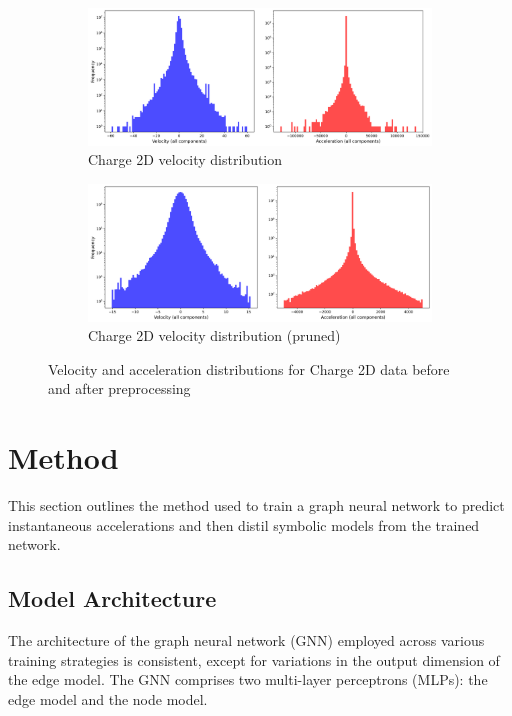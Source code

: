 \documentclass[11pt]{article}
\begin{document}
\begin{figure}[H]
    \centering
    \begin{subfigure}{0.9\textwidth}
        \includegraphics[width=\textwidth]{figs/charge_2_accel_vel_dist_unpruned.png}
        \caption{Charge 2D velocity distribution}
        \label{fig:charge_2_vel_dist_unpruned}
    \end{subfigure}
    \begin{subfigure}{0.9\textwidth}
        \includegraphics[width=\textwidth]{figs/charge_2_accel_vel_dist_pruned.png}
        \caption{Charge 2D velocity distribution (pruned)}
        \label{fig:charge_2_vel_dist_pruned}
    \end{subfigure}
    \caption{Velocity and acceleration distributions for Charge 2D data before and after preprocessing}
    \label{fig:distributions}
\end{figure}


\section{Method}
This section outlines the method used to train a graph neural network to predict instantaneous accelerations and then distil symbolic models from the trained network.

\subsection{Model Architecture}
The architecture of the graph neural network (GNN) employed across various training strategies is consistent, except for variations in the output dimension of the edge model. The GNN comprises two multi-layer perceptrons (MLPs): the edge model and the node model.
\end{document}
